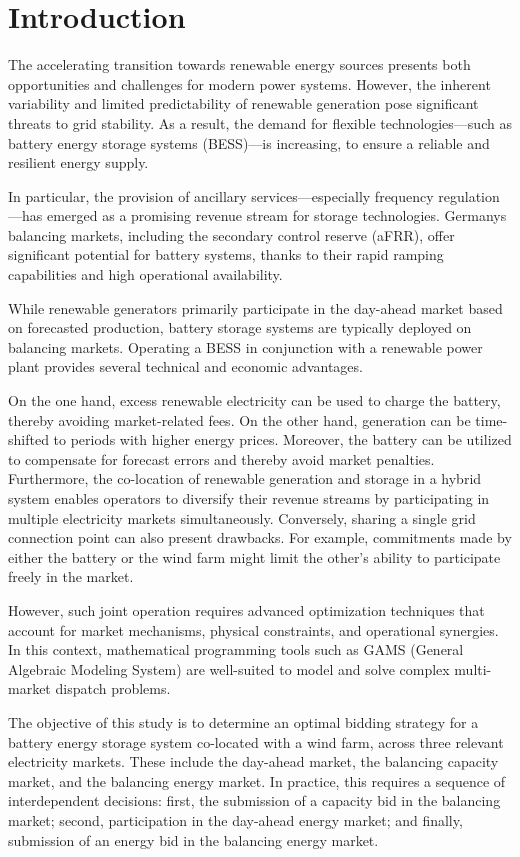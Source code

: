 \chapter{Introduction}

The accelerating transition towards renewable energy sources presents both opportunities
and challenges for modern power systems. However, the inherent variability and limited
predictability of renewable generation pose significant threats to grid stability.
As a result, the demand for flexible technologies—such as battery energy storage systems (BESS)—is increasing,
to ensure a reliable and resilient energy supply.

In particular, the provision of ancillary services—especially frequency regulation—has emerged
as a promising revenue stream for storage technologies. Germany\textquotesingle s balancing markets,
including the secondary control reserve (aFRR), offer significant potential for battery systems,
thanks to their rapid ramping capabilities and high operational availability.

While renewable generators primarily participate in the day-ahead market based on
forecasted production, battery storage systems are typically deployed on balancing markets.
Operating a BESS in conjunction with a renewable power plant provides several technical and economic advantages.

On the one hand, excess renewable electricity can be used to charge the battery, thereby
avoiding market-related fees. On the other hand, generation can be time-shifted to periods
with higher energy prices. Moreover, the battery can be utilized to compensate for forecast errors and thereby avoid market penalties.
Furthermore, the co-location of renewable generation and storage in a hybrid system
enables operators to diversify their revenue streams by participating in multiple electricity markets simultaneously.
Conversely, sharing a single grid connection point can also present drawbacks.
For example, commitments made by either the battery or the wind farm might
limit the other's ability to participate freely in the market.

However, such joint operation requires advanced optimization techniques that account for market
mechanisms, physical constraints, and operational synergies.
In this context, mathematical programming tools such as GAMS (General Algebraic Modeling System)
are well-suited to model and solve complex multi-market dispatch problems.

The objective of this study is to determine an optimal bidding strategy for a battery energy storage system
co-located with a wind farm, across three relevant electricity markets. These include the day-ahead market,
the balancing capacity market, and the balancing energy market.
In practice, this requires a sequence of interdependent decisions:
first, the submission of a capacity bid in the balancing market;
second, participation in the day-ahead energy market;
and finally, submission of an energy bid in the balancing energy market.

